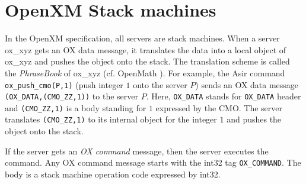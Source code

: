 
\section{OpenXM Stack machines}\label{sec:ox-stackmachines}

In the OpenXM specification, all servers are stack machines.
When a server ox\_xyz gets an OX data message,
it translates the data into a local object of ox\_xyz
and pushes the object onto the stack.
The translation scheme 
is called the {\it PhraseBook} of ox\_xyz (cf. OpenMath \cite{OpenMath}).
For example, the Asir command {\tt ox\_push\_cmo(P,1)}
(push integer $1$ onto the server $P$)
sends an OX data message
{\tt (OX\_DATA,(CMO\_ZZ,1))} to the server $P$.
Here,
{\tt OX\_DATA} stands for {\tt OX\_DATA} header and 
{\tt (CMO\_ZZ,1)} is a body standing for $1$ expressed 
by the CMO.
The server translates {\tt (CMO\_ZZ,1)} to its internal object for
the integer  $1$
and pushes the object onto the stack.

If the server gets an {\it OX command} message, then the server 
executes the command.
Any OX command message starts with the int32 tag {\tt OX\_COMMAND}.
The body is a stack machine operation code expressed by int32.

